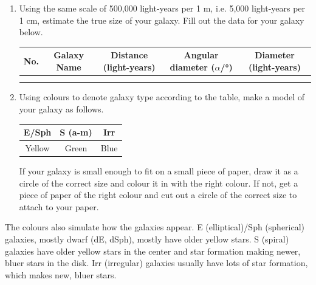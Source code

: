 \documentclass[main.tex]{subfiles}
\begin{document}
\begin{enumerate}
\item Using the same scale of 500,000 light-years per 1 m, i.e. 5,000 light-years per 1 cm, estimate the true size of your galaxy. Fill out the data for your galaxy below.
\begin{table}[h!]
\begin{center}
\begin{tabular}{|c|c|c|c|c|}\hline
No. & Galaxy Name & Distance (light-years) & Angular diameter ($\alpha$/\si{\degree}) & Diameter (light-years)\\\hline
&&&&\\
&&&&\\\hline
\end{tabular}
\end{center}
\label{tab:gal}
\end{table}
\item Using colours to denote galaxy type according to the table, make a model of your galaxy as follows.
\begin{table}[h!]
\begin{center}
\begin{tabular}{|c|c|c|}\hline
E/Sph & S (a-m) & Irr \\\hline
Yellow & Green & Blue\\\hline
\end{tabular}
\end{center}
\label{tab:galcol}
\end{table}

If your galaxy is small enough to fit on a small piece of paper, draw it as a circle of the correct size and colour it in with the right colour. If not, get a piece of paper of the right colour and cut out a circle of the correct size to attach to your paper.
\end{enumerate}

The colours also simulate how the galaxies appear. E (elliptical)/Sph (spherical) galaxies, mostly dwarf (dE, dSph), mostly have older yellow stars. S (spiral) galaxies have older yellow stars in the center and star formation making newer, bluer stars in the disk. Irr (irregular) galaxies usually have lots of star formation, which makes new, bluer stars.
\end{document}
